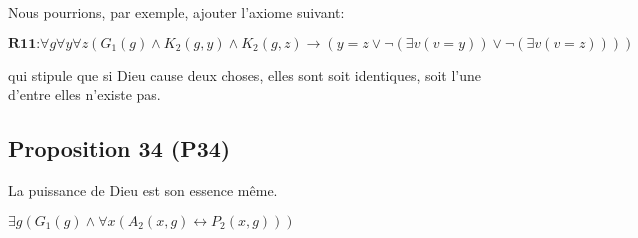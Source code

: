 \documentclass[10pt,a3paper]{article}
\begin{document}
\begin{center}
Nous pourrions, par exemple, ajouter l'axiome suivant:

$\textbf{R11:} \forall g \forall y \forall z (G_1(g) \land K_2(g,y) \land K_2(g,z) \rightarrow (y = z \lor \neg(\exists v (v = y)) \lor \neg(\exists v (v = z))))$

qui stipule que si Dieu cause deux choses, elles sont soit identiques, soit l'une d'entre elles n'existe pas.
\end{center}

\clearpage

\subsection{Proposition 34 (P34)}

\begin{center}
La puissance de Dieu est son essence même.
\end{center}

\begin{center}
$\exists g (G_1(g) \land \forall x (A_2(x,g) \leftrightarrow P_2(x,g)))$
\end{center}
\end{document}

